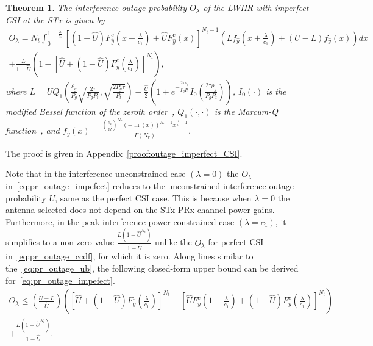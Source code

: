 \documentclass[12pt,draftcls,peerreview,onecolumn]{IEEEtran}
\newtheorem{theorem}{{\bf Theorem}}
\newcommand{\lam}{\lambda}
\newcommand{\Nt}{{N_t}}
\newcommand{\Nr}{{N_r}}
\newcommand{\Pt}{{P_t}}
\newcommand{\itau}{\tau}
\newcommand{\cone}{c_{1}}
\newcommand{\ctwo}{c_{2}}
\newcommand{\out}{O}
\newcommand{\m}{\cone}
\newcommand{\lambym}{\frac{\lam}{\m}}
\newcommand{\al}{\ctwo}
\newcommand{\snr}{\Omega}
\newcommand{\un}{U}
\newcommand{\outlam}{\out_{\lam}}
\newcommand{\unhat}{\widehat{\un}}
\newcommand{\snrhat}{\widehat{\snr}}
\newcommand{\gpilotpower}{P_g}
\newcommand{\yhat}{\hat{y}}
\newcommand{\Probglt}{L}
\newcommand{\albysnrhat}[1][]{\frac{\al#1}{\snrhat}}
\newcommand{\rhog}{\rho_g}
\begin{document}
\begin{theorem}
\label{thm:outage_imperfect_CSI}
The interference-outage probability $\outlam$ of the LWIIR with imperfect CSI at the STx is given by
\begin{multline}
\label{eq:pr_outage_impefect} 
\!\outlam \!=\! \Nt \!\int_{0}^{1-\lambym} 	
\!\left[\left(1 -\unhat\right)F_{\yhat}^{c}\left(x+\lambym\right) + \unhat F_{\yhat}^{c}\left(x\right)\right]^{\Nt-1}\!\! \left(\! \Probglt f_{\yhat}\!\left(\! x+\lambym\right) \!+\! (\un - \Probglt) f_{\yhat}\left(x\right)\!\right) dx\\
+ \frac{ \Probglt}{1 - \unhat} \left( 1 - \left[\unhat + \left(1 -\unhat\right)F_{\yhat}^{c}\left(\lambym\right)  \right]^{\Nt}  \right) ,
\end{multline}
%
where $\Probglt = \un Q_1\left(\frac{\rhog}{ \gpilotpower} \sqrt{\frac{2\itau}{ \gpilotpower\Pt}},\sqrt{\frac{2 \gpilotpower\itau}{\Pt}}\right)  - \frac{\unhat}{2} \left( 1 + e^{-\frac{2\itau\rhog}{ \gpilotpower\Pt}}I_{0}\left(\frac{2\itau\rhog}{ \gpilotpower\Pt} \right) \right)$, $I_{0}(\cdot)$ is the modified Bessel function of the zeroth order~\cite[(8.406.3)]{gradshteyn00_book},  $Q_1(\cdot,\cdot)$ is the Marcum-Q function~\cite[(4.34)]{simon_alouini_book},  and $f_{\yhat}\left( x\right) = \frac{ \left( \albysnrhat \right)^{\Nr} \left(-\ln\left(x \right)\right)^{\Nr-1} x^{\albysnrhat - 1}}{\Gamma(\Nr)}$.
\end{theorem}
%
\begin{IEEEproof}
	The proof is given in Appendix~\ref{proof:outage_imperfect_CSI}.
\end{IEEEproof}
%

Note that in the interference unconstrained case $\left(\lam=0\right)$ the $\outlam$ in~\eqref{eq:pr_outage_impefect} reduces to the unconstrained interference-outage probability $\un$, same as the perfect CSI case. This is because when $\lam=0$ the antenna selected does not depend on the  STx-PRx channel power gains. Furthermore, in the peak interference power constrained case $\left(\lam=\cone\right)$, it simplifies to a non-zero value $\frac{ \Probglt \left( 1-\unhat^{\Nt}\right) }{1-\unhat}$ unlike the $\outlam$ for perfect CSI in~\eqref{eq:pr_outage_ccdf}, for which it is zero. Along lines similar to the~\eqref{eq:pr_outage_ub}, the following closed-form upper bound can be derived for~\eqref{eq:pr_outage_impefect}. 
\begin{multline}
\label{eq:pr_outage_imperfect_ub}
\outlam  \leq \left(\frac{\un - \Probglt}{\unhat}\right)\left( \left[\unhat + \left(1-\unhat\right)F_{y}^{c}\left(\lambym\right)\right]^{\Nt} - \left[ \unhat F_{y}^{c}\left(1-\lambym\right) + \left(1-\unhat\right)F_{y}^{c}\left(\lambym\right)  \right]^{\Nt}\right) \\
+  \frac{ \Probglt \left( 1-\unhat^{\Nt}\right) }{1-\unhat}.
\end{multline}
\end{document}
